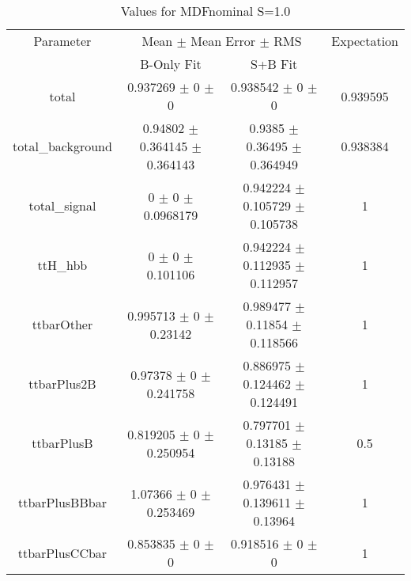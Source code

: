 \begin{table}
\centering
\caption{Values for MDFnominal S=1.0}
\begin{tabular}{cccc}
\toprule
Parameter & \multicolumn{2}{c}{Mean $\pm$ Mean Error $\pm$ RMS} & Expectation\\
 & B-Only Fit & S+B Fit & \\
\midrule
total & \num{0.937269} $\pm$ \num{0} $\pm$ \num{0} & \num{0.938542} $\pm$ \num{0} $\pm$ \num{0} & \num{0.939595}\\
total\_background & \num{0.94802} $\pm$ \num{0.364145} $\pm$ \num{0.364143} & \num{0.9385} $\pm$ \num{0.36495} $\pm$ \num{0.364949} & \num{0.938384}\\
total\_signal & \num{0} $\pm$ \num{0} $\pm$ \num{0.0968179} & \num{0.942224} $\pm$ \num{0.105729} $\pm$ \num{0.105738} & \num{1}\\
ttH\_hbb & \num{0} $\pm$ \num{0} $\pm$ \num{0.101106} & \num{0.942224} $\pm$ \num{0.112935} $\pm$ \num{0.112957} & \num{1}\\
ttbarOther & \num{0.995713} $\pm$ \num{0} $\pm$ \num{0.23142} & \num{0.989477} $\pm$ \num{0.11854} $\pm$ \num{0.118566} & \num{1}\\
ttbarPlus2B & \num{0.97378} $\pm$ \num{0} $\pm$ \num{0.241758} & \num{0.886975} $\pm$ \num{0.124462} $\pm$ \num{0.124491} & \num{1}\\
ttbarPlusB & \num{0.819205} $\pm$ \num{0} $\pm$ \num{0.250954} & \num{0.797701} $\pm$ \num{0.13185} $\pm$ \num{0.13188} & \num{0.5}\\
ttbarPlusBBbar & \num{1.07366} $\pm$ \num{0} $\pm$ \num{0.253469} & \num{0.976431} $\pm$ \num{0.139611} $\pm$ \num{0.13964} & \num{1}\\
ttbarPlusCCbar & \num{0.853835} $\pm$ \num{0} $\pm$ \num{0} & \num{0.918516} $\pm$ \num{0} $\pm$ \num{0} & \num{1}\\
\bottomrule
\end{tabular}
\end{table}